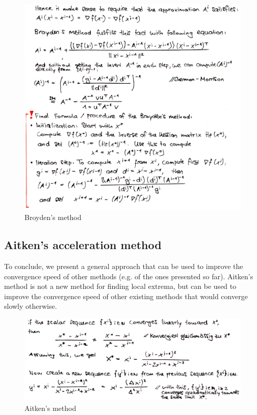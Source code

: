 \begin{figure}[H]
\centering
\includegraphics[width=1\textwidth]{figures/broyden.png}
\caption{Broyden's method}
\end{figure}

\clearpage
\subsection{Aitken's acceleration method}
To conclude, we present a general approach that can be used to improve the convergence speed of other methods (e.g. of the ones presented so far).
Aitken’s method is not a new method for finding local extrema, but can be used to improve the convergence speed of other existing methods that would converge slowly otherwise.

\begin{figure}[H]
\centering
\includegraphics[width=1\textwidth]{figures/aitken.png}
\caption{Aitken's method}
\end{figure}

\clearpage